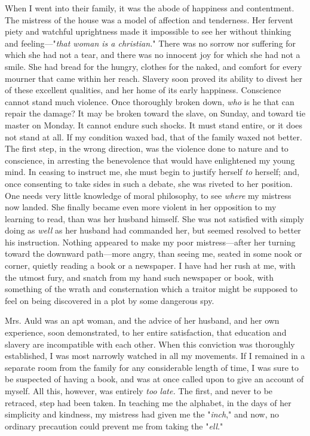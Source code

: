 When I went into their family, it was the abode of happiness and
contentment. The mistress of the house was a model of affection and
tenderness. Her fervent piety and watchful uprightness made it
impossible to see her without thinking and feeling---"\emph{that woman
is a christian.}" There was no sorrow nor suffering for which she had
not a tear, and there was no innocent joy for which she had not a smile.
She had bread for the hungry, clothes for the naked, and comfort for
every mourner that came within her reach. Slavery soon proved its
ability to divest her of these excellent qualities, and her home of its
early happiness. Conscience cannot stand much violence. Once thoroughly
broken down, \emph{who} is he that can repair the damage? It may be
broken toward the slave, on Sunday, and toward tie master on Monday. It
cannot endure such shocks. It must stand entire, or it does not stand at
all. If my condition waxed bad, that of the family waxed not better. The
first step, in the wrong direction, was the violence done to
{\protect\hypertarget{154}{}{}}nature and to conscience, in arresting
the benevolence that would have enlightened my young mind. In ceasing to
instruct me, she must begin to justify herself \emph{to} herself; and,
once consenting to take sides in such a debate, she was riveted to her
position. One needs very little knowledge of moral philosophy, to see
\emph{where} my mistress now landed. She finally became even more
violent in her opposition to my learning to read, than was her husband
himself. She was not satisfied with simply doing as \emph{well} as her
husband had commanded her, but seemed resolved to better his
instruction. Nothing appeared to make my poor mistress---after her
turning toward the downward path---more angry, than seeing me, seated in
some nook or corner, quietly reading a book or a newspaper. I have had
her rush at me, with the utmost fury, and snatch from my hand such
newspaper or book, with something of the wrath and consternation which a
traitor might be supposed to feel on being discovered in a plot by some
dangerous spy.

Mrs. Auld was an apt woman, and the advice of her husband, and her own
experience, soon demonstrated, to her entire satisfaction, that
education and slavery are incompatible with each other. When this
conviction was thoroughly established, I was most narrowly watched in
all my movements. If I remained in a separate room from the family for
any considerable length of time, I was sure to be suspected of having a
book, and was at once called upon to give an account of myself. All
this, however, was entirely \emph{too late.} The first, and never to be
retraced, step had been taken. In teaching me the alphabet, in the
{\protect\hypertarget{155}{}{}}days of her simplicity and kindness, my
mistress had given me the "\emph{inch}," and now, no ordinary precaution
could prevent me from taking the "\emph{ell}."

